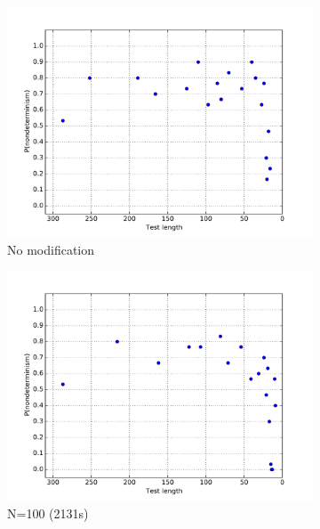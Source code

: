 {\begin{figure}
\centering 
\begin{subfigure}{0.3\columnwidth}
\centering
\includegraphics[width=\columnwidth]{redisddmin}
\caption{No modification}
\label{fig:r1}
\end{subfigure}
\begin{subfigure}{0.3\columnwidth}
\centering
\includegraphics[width=\columnwidth]{redisforcep}
\caption{N=100 (2131s)}
\label{fig:r2}
\end{subfigure}
\begin{subfigure}{0.3\columnwidth}
\centering

\end{subfigure}
\end{figure}}
